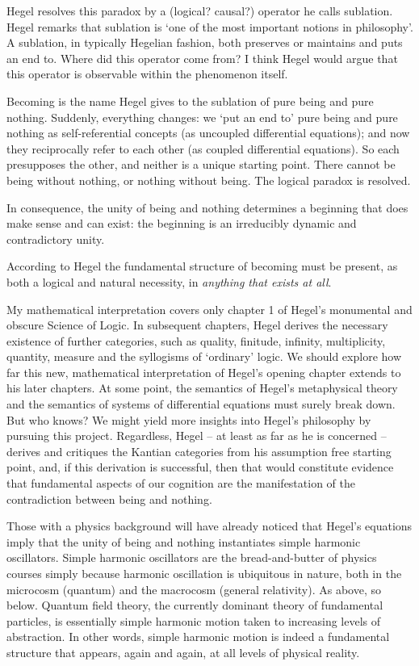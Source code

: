\documentclass[
]{book}
\begin{document}
Hegel resolves this paradox by a (logical? causal?) operator he calls sublation. Hegel remarks that sublation is `one of the most important notions in philosophy'. A sublation, in typically Hegelian fashion, both preserves or maintains and puts an end to. Where did this operator come from? I think Hegel would argue that this operator is observable within the phenomenon itself.

Becoming is the name Hegel gives to the sublation of pure being and pure nothing. Suddenly, everything changes: we `put an end to' pure being and pure nothing as self-referential concepts (as uncoupled differential equations); and now they reciprocally refer to each other (as coupled differential equations). So each presupposes the other, and neither is a unique starting point. There cannot be being without nothing, or nothing without being. The logical paradox is resolved.

In consequence, the unity of being and nothing determines a beginning that does make sense and can exist: the beginning is an irreducibly dynamic and contradictory unity.

According to Hegel the fundamental structure of becoming must be present, as both a logical and natural necessity, in \emph{anything that exists at all}.

My mathematical interpretation covers only chapter 1 of Hegel's monumental and obscure Science of Logic. In subsequent chapters, Hegel derives the necessary existence of further categories, such as quality, finitude, infinity, multiplicity, quantity, measure and the syllogisms of `ordinary' logic. We should explore how far this new, mathematical interpretation of Hegel's opening chapter extends to his later chapters. At some point, the semantics of Hegel's metaphysical theory and the semantics of systems of differential equations must surely break down. But who knows? We might yield more insights into Hegel's philosophy by pursuing this project. Regardless, Hegel -- at least as far as he is concerned -- derives and critiques the Kantian categories from his assumption free starting point, and, if this derivation is successful, then that would constitute evidence that fundamental aspects of our cognition are the manifestation of the contradiction between being and nothing.

Those with a physics background will have already noticed that Hegel's equations imply that the unity of being and nothing instantiates simple harmonic oscillators. Simple harmonic oscillators are the bread-and-butter of physics courses simply because harmonic oscillation is ubiquitous in nature, both in the microcosm (quantum) and the macrocosm (general relativity). As above, so below. Quantum field theory, the currently dominant theory of fundamental particles, is essentially simple harmonic motion taken to increasing levels of abstraction. In other words, simple harmonic motion is indeed a fundamental structure that appears, again and again, at all levels of physical reality.
\end{document}
